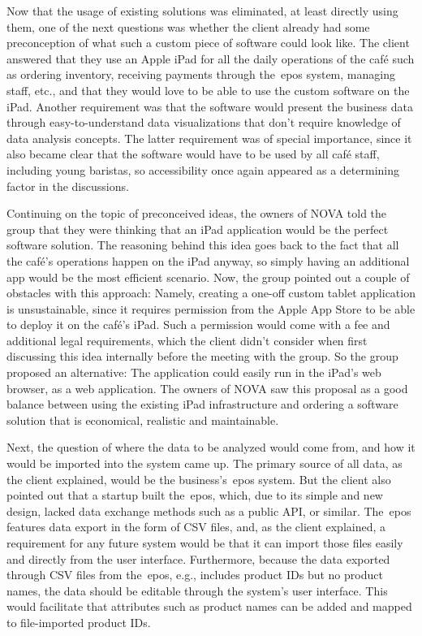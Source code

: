 Now that the usage of existing solutions was eliminated, at least directly using them, one of the next questions was
whether the client already had some preconception of what such a custom piece of software could look like.
The client answered that they use an Apple iPad for all the daily operations of the café such as ordering inventory,
receiving payments through the~\acrfull{epos} system, managing staff, etc., and that they would love to be able to use
the custom software on the iPad.
Another requirement was that the software would present the business data through easy-to-understand data visualizations
that don't require knowledge of data analysis concepts.
The latter requirement was of special importance, since it also became clear that the software would have to be used by
all café staff, including young baristas, so accessibility once again appeared as a determining factor in the
discussions.

Continuing on the topic of preconceived ideas, the owners of NOVA told the group that they were thinking that an iPad
application would be the perfect software solution.
The reasoning behind this idea goes back to the fact that all the café's operations happen on the iPad anyway, so simply
having an additional app would be the most efficient scenario.
Now, the group pointed out a couple of obstacles with this approach: Namely, creating a one-off custom tablet
application is unsustainable, since it requires permission from the Apple App Store to be able to deploy it on the
café's iPad.
Such a permission would come with a fee and additional legal requirements, which the client didn't consider when first
discussing this idea internally before the meeting with the group.
So the group proposed an alternative: The application could easily run in the iPad's web browser, as a web application.
The owners of NOVA saw this proposal as a good balance between using the existing iPad infrastructure and ordering a
software solution that is economical, realistic and maintainable.

Next, the question of where the data to be analyzed would come from, and how it would be imported into the system
came up.
The primary source of all data, as the client explained, would be the business's~\acrshort{epos} system.
But the client also pointed out that a startup built the~\acrshort{epos}, which, due to its simple and new design,
lacked data exchange methods such as a public API, or similar.
The~\acrshort{epos} features data export in the form of CSV files, and, as the client explained, a requirement for any
future system would be that it can import those files easily and directly from the user interface.
Furthermore, because the data exported through CSV files from the~\acrshort{epos}, e.g., includes product IDs but no
product names, the data should be editable through the system's user interface.
This would facilitate that attributes such as product names can be added and mapped to file-imported product IDs.

